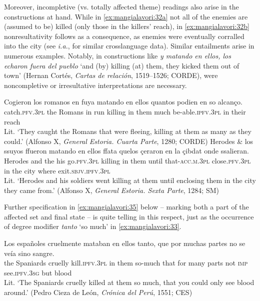 \documentclass[output=paper,colorlinks,citecolor=brown,
]{langscibook}
\begin{document}
Moreover, incompletive (vs. totally affected theme) readings also arise in the constructions at hand. While in  \ref{ex:mangialavori:32a} not all of the enemies are (assumed to be) killed (only those in the killers’ reach), in  \ref{ex:mangialavori:32b} nonresultativity follows as a consequence, as enemies were eventually corralled into the city (see \citealt{Kratzer2000} \textit{i.a.}, for similar crosslanguage data). Similar entailments arise in numerous examples. Notably, in constructions like \textit{y matando en ellos, los echaron fuera del pueblo} ‘and (by) killing (at) them, they kicked them out of town' (Hernan Cortés, \textit{Cartas de relación}, 1519--1526; CORDE), were noncompletive or irresultative interpretations are necessary. 

\ea
  \ea \label{ex:mangialavori:32a}
    \gll Cogieron los romanos en fuya matando en ellos quantos podien en so alcanço.\\
catch.\textsc{pfv}.\textsc{3pl} the Romans in run killing in them much be-able.\textsc{ipfv}.\textsc{3pl} in their reach\\
    \glt Lit. ‘They caught the Romans that were fleeing, killing at them as many as they could.’ (Alfonso X, \textit{General Estoria. Cuarta Parte}, 1280; CORDE) 
  \ex \label{ex:mangialavori:32b}
    \gll Herodes \& los ssuyos ffueron matando en ellos ffata quelos çeraron en la çibdat onde ssalieran.\\  
Herodes and the his go.\textsc{pfv}.\textsc{3pl} killing in them until that-\textsc{acc}.\textsc{m}.\textsc{3pl} close.\textsc{pfv}.\textsc{3pl} in the city where exit.\textsc{sbjv}.\textsc{ipfv}.\textsc{3pl}\\
    \glt Lit. ‘Herodes and his soldiers went killing at them until enclosing them in the city they came from.’ (Alfonso X, \textit{General Estoria. Sexta Parte}, 1284; SM) 
  \z 
\z 

Further specification in  \ref{ex:mangialavori:35} below -- marking both a part of the affected set and final state -- is quite telling in this respect, just as the occurrence of degree modifier \textit{tanto} `so much' in  \ref{ex:mangialavori:33}.

\ea\label{ex:mangialavori:33}
    \gll Los españoles cruelmente mataban en ellos tanto, que por muchas partes no se veía sino sangre.\\
the Spaniards cruelly kill.\textsc{ipfv}.\textsc{3pl} in them so-much that for many parts not \textsc{imp} see.\textsc{ipfv}.\textsc{3sg} but blood\\
    \glt Lit. ‘The Spaniards cruelly killed at them so much, that you could only see blood around.’ (Pedro Cieza de León, \textit{Crónica del Perú}, 1551; CES)
\z
\end{document}
